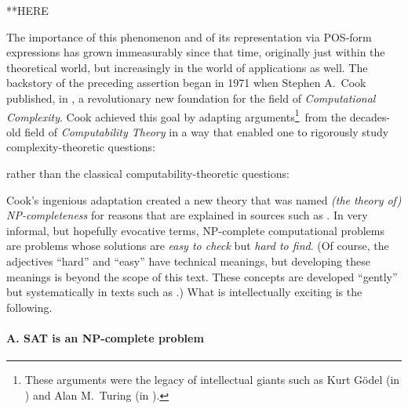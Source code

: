 \medskip

**HERE

The importance of this phenomenon and of its representation via
POS-form expressions has grown immeasurably since that time,
originally just within the theoretical world, but increasingly in the
world of applications as well.  The backstory of the preceding
assertion began in 1971 when Stephen A.~Cook 
published, in \cite{Cook71}, a revolutionary new foundation for the
field of {\it Computational Complexity}.  Cook achieved this goal by adapting
arguments\footnote{These arguments were the legacy of intellectual
  giants such as Kurt G\"{o}del  (in
  \cite{Goedel31}) and Alan M.~Turing  (in
  \cite{Turing36}).}~from the decades-old field of {\it Computability
  Theory}  in a way that enabled one to
rigorously study complexity-theoretic questions:

\hspace*{.5in}{\em How hard is it to compute function $f$?}

\noindent
rather than the classical computability-theoretic questions:

\hspace*{.5in}{\em Can one write a program to compute function $f$?}

\noindent
Cook's ingenious adaptation created a new theory that was named {\it
  (the theory of) {\sf NP}-completeness} 
 for reasons that are
explained in sources such as .  In very informal, but
hopefully evocative terms, {\sf NP}-complete computational problems
are problems whose solutions are {\em easy to check} but {\em hard to
  find}.  (Of course, the adjectives ``hard'' and ``easy'' have
technical meanings, but developing these meanings is beyond the scope
of this text.  These concepts are developed ``gently'' but
systematically in texts such as .)  What is
intellectually exciting is the following.


\paragraph{\small\sf A. {\sf SAT} is an {\sf NP}-complete problem}

